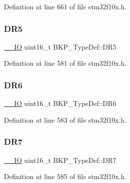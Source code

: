 Definition at line 661 of file stm32f10x.\+h.

\mbox{\label{struct_b_k_p___type_def_a35b107064600b60af1c42a5e5a6a16c1}} 
\subsubsection{\texorpdfstring{D\+R5}{DR5}}
{\footnotesize\ttfamily \hyperlink{core__sc300_8h_aec43007d9998a0a0e01faede4133d6be}{\+\_\+\+\_\+\+IO} uint16\+\_\+t B\+K\+P\+\_\+\+Type\+Def\+::\+D\+R5}



Definition at line 581 of file stm32f10x.\+h.

\mbox{\label{struct_b_k_p___type_def_a127b4555819656767655092cf43a4ae9}} 
\subsubsection{\texorpdfstring{D\+R6}{DR6}}
{\footnotesize\ttfamily \hyperlink{core__sc300_8h_aec43007d9998a0a0e01faede4133d6be}{\+\_\+\+\_\+\+IO} uint16\+\_\+t B\+K\+P\+\_\+\+Type\+Def\+::\+D\+R6}



Definition at line 583 of file stm32f10x.\+h.

\mbox{\label{struct_b_k_p___type_def_a2467a2e314a670b8638ad75f6d9122bf}} 
\subsubsection{\texorpdfstring{D\+R7}{DR7}}
{\footnotesize\ttfamily \hyperlink{core__sc300_8h_aec43007d9998a0a0e01faede4133d6be}{\+\_\+\+\_\+\+IO} uint16\+\_\+t B\+K\+P\+\_\+\+Type\+Def\+::\+D\+R7}



Definition at line 585 of file stm32f10x.\+h.

\mbox{\label{struct_b_k_p___type_def_a70ccbdbdaf902903f378f110685ee647}} 
